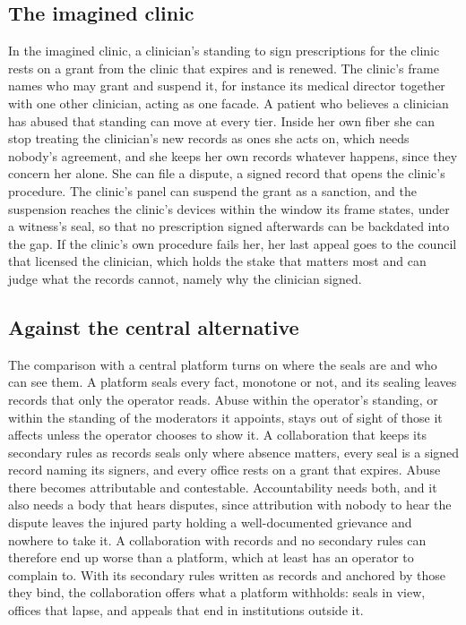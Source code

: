 \subsection{The imagined clinic}\label{sec:clinic}

In the imagined clinic, a clinician's standing to sign prescriptions for the clinic rests on a grant
from the clinic that expires and is renewed. The clinic's frame names who may grant and suspend it,
for instance its medical director together with one other clinician, acting as one facade. A
patient who believes a clinician has abused that standing can move at every tier. Inside her own
fiber she can stop treating the clinician's new records as ones she acts on, which needs nobody's
agreement, and she keeps her own records whatever happens, since they concern her alone. She can
file a dispute, a signed record that opens the clinic's procedure. The clinic's panel can suspend
the grant as a sanction, and the suspension reaches the clinic's devices within the window its frame
states, under a witness's seal, so that no prescription signed afterwards can be backdated into the
gap. If the clinic's own procedure fails her, her last appeal goes to the council that licensed the
clinician, which holds the stake that matters most and can judge what the records cannot, namely why
the clinician signed.

\subsection{Against the central alternative}\label{sec:central}

The comparison with a central platform turns on where the seals are and who can see them. A platform
seals every fact, monotone or not, and its sealing leaves records that only the operator reads.
Abuse within the operator's standing, or within the standing of the moderators it appoints, stays
out of sight of those it affects unless the operator chooses to show it. A collaboration that keeps
its secondary rules as records seals only where absence matters, every seal is a signed record
naming its signers, and every office rests on a grant that expires. Abuse there becomes attributable
and contestable. Accountability needs both, and it also needs a body that hears disputes, since
attribution with nobody to hear the dispute leaves the injured party holding a well-documented
grievance and nowhere to take it. A collaboration with records and no secondary rules can therefore
end up worse than a platform, which at least has an operator to complain to. With its secondary
rules written as records and anchored by those they bind, the collaboration offers what a platform
withholds: seals in view, offices that lapse, and appeals that end in institutions outside it.

